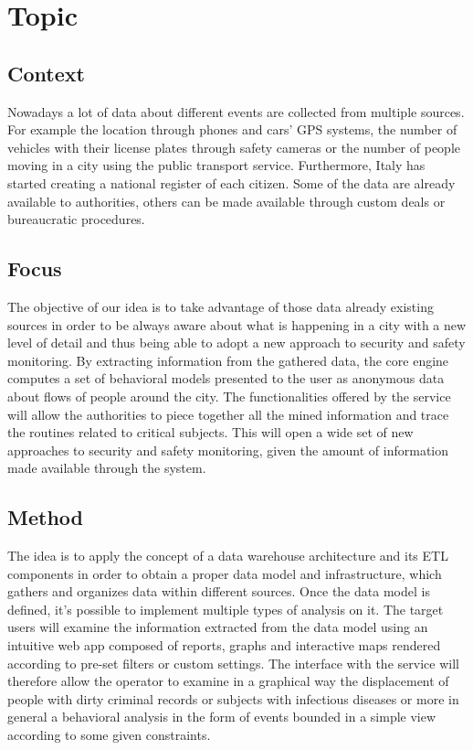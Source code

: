 \documentclass[../main.tex]{subfiles}
\begin{document}
 
    \chapter{Topic}\label{ch:topic}


    \section{Context}\label{sec:context}
    Nowadays a lot of data about different events are collected from multiple sources. For example the location through phones and cars’ GPS systems, the number of vehicles with their license plates through safety cameras or the number of people moving in a city using the public transport service. Furthermore, Italy has started creating a national register of each citizen. Some of the data are already available to authorities, others can be made available through custom deals or bureaucratic procedures.


    \section{Focus}\label{sec:focus}
    The objective of our idea is to take advantage of those data already existing sources in order to be always aware about what is happening in a city with a new level of detail and thus being able to adopt a new approach to security and safety monitoring. By extracting information from the gathered data, the core engine computes a set of behavioral models presented to the user as anonymous data about flows of people around the city. The functionalities offered by the service will allow the authorities to piece together all the mined information and trace the routines related to critical subjects. This will open a wide set of new approaches to security and safety monitoring, given the amount of information made available through the system.


    \section{Method}\label{sec:method}
    The idea is to apply the concept of a data warehouse architecture and its ETL components in order to obtain a proper data model and infrastructure, which gathers and organizes data within different sources.
    Once the data model is defined, it’s possible to implement multiple types of analysis on it.
    The target users will examine the information extracted from the data model using an intuitive web app composed of reports, graphs and interactive maps rendered according to pre-set filters or custom settings. The interface with the service will therefore allow the operator to examine in a graphical way the displacement of people with dirty criminal records or subjects with infectious diseases or more in general a behavioral analysis in the form of events bounded in a simple view according to some given constraints.
\end{document}
